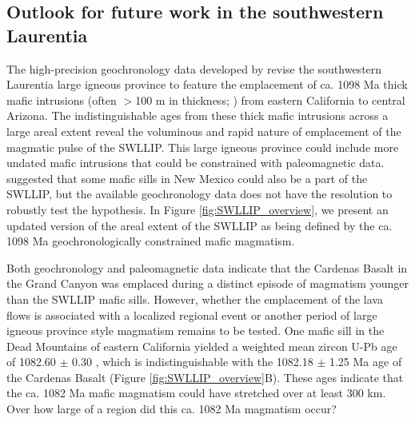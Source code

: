 \subsection*{Outlook for future work in the southwestern Laurentia}

The high-precision geochronology data developed by \cite{Mohr2024a} revise the southwestern Laurentia large igneous province to feature the emplacement of ca. 1098 Ma thick mafic intrusions (often $>$100 m in thickness; \cite{Wright1967a}) from eastern California to central Arizona. The indistinguishable ages from these thick mafic intrusions across a large areal extent reveal the voluminous and rapid nature of emplacement of the magmatic pulse of the SWLLIP. This large igneous province could include more undated mafic intrusions that could be constrained with paleomagnetic data. \cite{Bright2014a} suggested that some mafic sills in New Mexico could also be a part of the SWLLIP, but the available geochronology data does not have the resolution to robustly test the hypothesis. In Figure \ref{fig:SWLLIP_overview}, we present an updated version of the areal extent of the SWLLIP as being defined by the ca. 1098 Ma geochronologically constrained mafic magmatism. 

Both geochronology and paleomagnetic data indicate that the Cardenas Basalt in the Grand Canyon was emplaced during a distinct episode of magmatism younger than the SWLLIP mafic sills. However, whether the emplacement of the lava flows is associated with a localized regional event or another period of large igneous province style magmatism remains to be tested. One mafic sill in the Dead Mountains of eastern California yielded a weighted mean zircon U-Pb age of 1082.60 $\pm$ 0.30 \cite{Mohr2024a}, which is indistinguishable with the 1082.18 $\pm$ 1.25 Ma age of the Cardenas Basalt (Figure \ref{fig:SWLLIP_overview}B). These ages indicate that the ca. 1082 Ma mafic magmatism could have stretched over at least 300 km. Over how large of a region did this ca. 1082 Ma magmatism occur?

